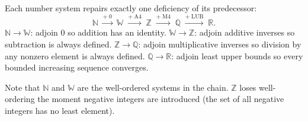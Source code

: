 \begin{remark}
Each number system repairs exactly one deficiency of its predecessor:
\[
\mathbb{N}
\;\xrightarrow{+\;0}\;
\mathbb{W}
\;\xrightarrow{+\;\mathrm{A4}}\;
\mathbb{Z}
\;\xrightarrow{+\;\mathrm{M4}}\;
\mathbb{Q}
\;\xrightarrow{+\;\mathrm{LUB}}\;
\mathbb{R}.
\]
$\mathbb{N} \to \mathbb{W}$: adjoin $0$ so addition has an identity.
$\mathbb{W} \to \mathbb{Z}$: adjoin additive inverses so subtraction is
always defined.
$\mathbb{Z} \to \mathbb{Q}$: adjoin multiplicative inverses so division by
any nonzero element is always defined.
$\mathbb{Q} \to \mathbb{R}$: adjoin least upper bounds so every bounded
increasing sequence converges.

Note that $\mathbb{N}$ and $\mathbb{W}$ are the well-ordered systems in the
chain.
$\mathbb{Z}$ loses well-ordering the moment negative integers are introduced
(the set of all negative integers has no least element).
\end{remark}
